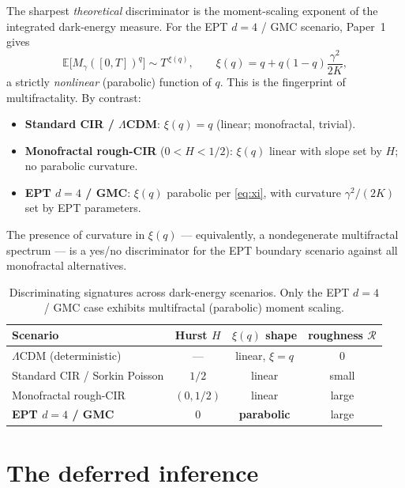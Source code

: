 \documentclass[11pt,a4paper]{article}
\begin{document}
The sharpest \emph{theoretical} discriminator is the moment-scaling exponent of the integrated dark-energy measure. For the EPT $d=4$ / GMC scenario, Paper~1 gives
\begin{equation}
\mathbb{E}\big[M_\gamma([0,T])^q\big] \sim T^{\,\xi(q)},\qquad
\xi(q) = q + q(1-q)\frac{\gamma^2}{2K},
\label{eq:xi}
\end{equation}
a strictly \emph{nonlinear} (parabolic) function of $q$. This is the fingerprint of multifractality. By contrast:
\begin{itemize}
\item \textbf{Standard CIR / $\Lambda$CDM}: $\xi(q)=q$ (linear; monofractal, trivial).
\item \textbf{Monofractal rough-CIR} ($0<H<1/2$): $\xi(q)$ linear with slope set by $H$; no parabolic curvature.
\item \textbf{EPT $d=4$ / GMC}: $\xi(q)$ parabolic per \eqref{eq:xi}, with curvature $\gamma^2/(2K)$ set by EPT parameters.
\end{itemize}
The presence of curvature in $\xi(q)$ --- equivalently, a nondegenerate multifractal spectrum --- is a yes/no discriminator for the EPT boundary scenario against all monofractal alternatives.

\begin{table}[h]
\centering
\begin{tabular}{|l|c|c|c|}
\hline
Scenario & Hurst $H$ & $\xi(q)$ shape & roughness $\mathcal{R}$ \\
\hline
$\Lambda$CDM (deterministic) & --- & linear, $\xi=q$ & $0$ \\
Standard CIR / Sorkin Poisson & $1/2$ & linear & small \\
Monofractal rough-CIR & $(0,1/2)$ & linear & large \\
\textbf{EPT $d=4$ / GMC} & $0$ & \textbf{parabolic} & large \\
\hline
\end{tabular}
\caption{Discriminating signatures across dark-energy scenarios. Only the EPT $d=4$ / GMC case exhibits multifractal (parabolic) moment scaling.}
\end{table}

\section{The deferred inference}
\end{document}

